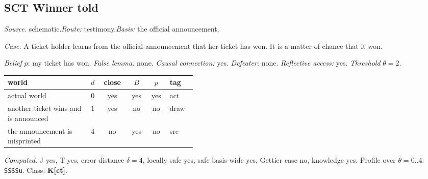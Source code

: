 \subsection*{SCT \enspace Winner told}
\noindent\textit{Source.} schematic.\quad \textit{Route:} testimony.\quad \textit{Basis:} the official announcement.\par
\noindent\textit{Case.} A ticket holder learns from the official announcement that her ticket has won. It is a matter of chance that it won.\par
\noindent\textit{Belief} $p$: my ticket has won.
 \textit{False lemma:} none. \textit{Causal connection:} yes. \textit{Defeater:} none. \textit{Reflective access:} yes. \textit{Threshold} $\theta = 2$.\par
\begin{center}\begin{tabular}{@{}p{0.43\linewidth}rcccl@{}}
world & $d$ & close & $B$ & $p$ & tag \\ \midrule
actual world & 0 & yes & yes & yes & act \\
another ticket wins and is announced & 1 & yes & no & no & draw \\
the announcement is misprinted & 4 & no & yes & no & src \\
\end{tabular}\end{center}
\noindent\textit{Computed.} J yes, T yes, error distance $\delta = 4$, locally safe yes, safe basis-wide yes, Gettier case no, knowledge yes. Profile over $\theta = 0..4$: \texttt{SSSSu}. Class: \textbf{K[ct]}.
\par\medskip
{}
